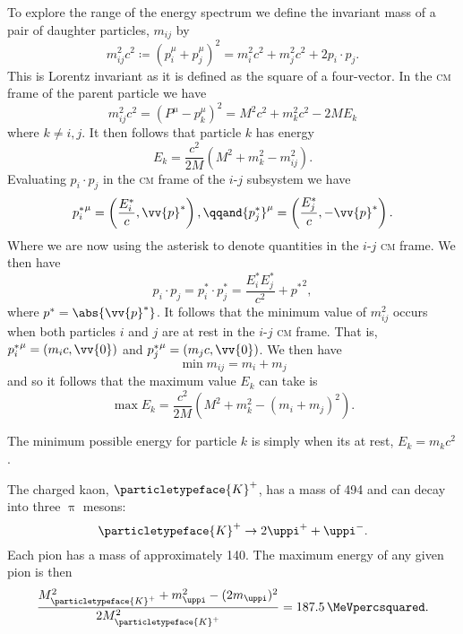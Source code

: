 \documentclass[fleqn]{NotesClass}
\makeatletter
\newcommand{\PBASE@kaon}{\ensuremath{\particletypeface{K}}}
\newcommand{\Pkaonplus}{\ensuremath{\PBASE@kaon^+}}
\newcommand{\PBASE@pion}{\ensuremath{\uppi}}
\newcommand{\PBASE@pion}{\ensuremath{\pi}}
\newcommand{\Ppion}{\PBASE@pion}
\newcommand{\Ppionplus}{\ensuremath{\Ppion^+}}
\newcommand{\Ppionminus}{\ensuremath{\Ppion^-}}
\newcommand{\Ppi}{\Ppion}
\newcommand{\Ppip}{\Ppionplus}
\newcommand{\Ppim}{\Ppionminus}
\newcommand{\CM}{\textsc{cm}}
\makeatother
\begin{document}
    To explore the range of the energy spectrum we define the invariant mass of a pair of daughter particles, \(m_{ij}\) by
    \begin{equation}
        m_{ij}^2c^2 \coloneqq (p_i^\mu + p_j^\mu)^2 = m_i^2c^2 + m_j^2c^2 + 2p_i\cdot p_j.
    \end{equation}
    This is Lorentz invariant as it is defined as the square of a four-vector.
    In the \CM{} frame of the parent particle we have
    \begin{equation}
        m_{ij}^2c^2 = (P^\mu - p_k^\mu)^2 = M^2c^2 + m_k^2c^2 - 2ME_k
    \end{equation}
    where \(k \ne i, j\).
    It then follows that particle \(k\) has energy
    \begin{equation}
        E_k = \frac{c^2}{2M}(M^2 + m_k^2 - m_{ij}^2).
    \end{equation}
    Evaluating \(p_i\cdot p_j\) in the \CM{} frame of the \(i\)-\(j\) subsystem we have
    \begin{equation}
        {p_i^*}^\mu = \left( \frac{E_i^*}{c}, \vv{p}^* \right), \qqand {p_j^*}^\mu = \left( \frac{E_j^*}{c}, -\vv{p}^* \right).
    \end{equation}
    Where we are now using the asterisk to denote quantities in the \(i\)-\(j\) \CM{} frame.
    We then have
    \begin{equation}
        p_i \cdot p_j = p_i^* \cdot p_j^* = \frac{E_i^*E_j^*}{c^2} + {p^*}^2,
    \end{equation}
    where \(p^* = \abs{\vv{p}^*}\).
    It follows that the minimum value of \(m_{ij}^2\) occurs when both particles \(i\) and \(j\) are at rest in the \(i\)-\(j\) \CM{} frame.
    That is, \({p_i^*}^\mu = (m_ic, \vv{0})\) and \({p_j^*}^\mu = (m_jc, \vv{0})\).
    We then have
    \begin{equation}
        \min m_{ij} = m_i + m_j
    \end{equation}
    and so it follows that the maximum value \(E_k\) can take is
    \begin{equation}
        \max E_k = \frac{c^2}{2M}(M^2 + m_k^2 - (m_i + m_j)^2).
    \end{equation}
    
    The minimum possible energy for particle \(k\) is simply when its at rest, \(E_k = m_kc^2\).
    
    \begin{exm}{}{}
        The charged kaon, \Pkaonplus, has a mass of \qty{494}{\MeVpercsquared} and can decay into three \Ppi{} mesons:
        \begin{equation}
            \Pkaonplus \to 2\Ppip + \Ppim.
        \end{equation}
        Each pion has a mass of approximately \qty{140}{\MeVpercsquared}.
        The maximum energy of any given pion is then
        \begin{equation}
            \frac{M_{\Pkaonplus}^2 + m_{\Ppi}^2 - (2m_{\Ppi})^2}{2M_{\Pkaonplus}^2} = \qty{187.5}{\MeVpercsquared}.
        \end{equation}
    \end{exm}
    
\end{document}
